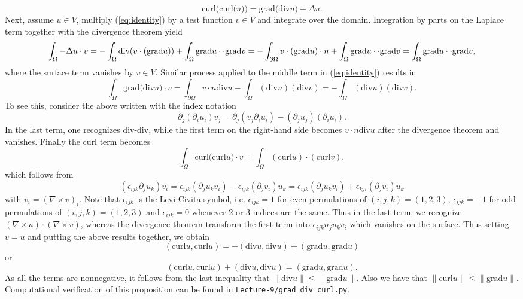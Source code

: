 \documentclass[a4paper,11pt]{article}
\newcommand{\norm}[1]{\ensuremath{\|#1\|}}
\newcommand{\Div}[1] {\ensuremath{\text{div}#1}}
\newcommand{\Grad}[1]{\ensuremath{\text{grad}#1}}
\newcommand{\Curl}[1]{\ensuremath{\text{curl}#1}}
\begin{document}
\begin{equation}
\label{eq:identity}
\Curl(\Curl(u)) = \Grad(\Div{u}) - \Delta u.
\end{equation}
Next, assume $u\in V$, multiply (\ref{eq:identity}) by a 
test function $v\in V$ and integrate over the domain. Integration by parts on the Laplace term together with
the divergence theorem yield
\[
\int_{\Omega}-\Delta u\cdot v = -\int_{\Omega}\Div(v\cdot(\Grad{u})) + \int_{\Omega} \Grad{u} \cdot\cdot \Grad{v} = 
-\int_{\partial\Omega}v\cdot(\Grad{u})\cdot n +
\int_{\Omega} \Grad{u} \cdot\cdot \Grad{v}{\tiny} = 
\int_{\Omega} \Grad{u} \cdot\cdot \Grad{v}{\tiny},
\]
where the surface term vanishes by $v\in V$. Similar process
applied to the middle term in (\ref{eq:identity}) results in 
\[
\int_\Omega \Grad(\Div{u})\cdot v = 
\int_{\partial\Omega} v\cdot n \Div{u}
- \int_{\Omega}(\Div{u})(\Div{v})=
- \int_{\Omega}(\Div{u})(\Div{v})
.
\]
To see this, consider the above written with the index notation
\[
\partial_j(\partial_i u_i)v_j =
\partial_j(v_j \partial_i u_i) - 
(\partial_j u_j)(\partial_i u_i).
\]
In the last term, one recognizes div-div, while the first term on the right-hand side becomes 
$v\cdot n \Div{u}$ after the divergence theorem and vanishes. Finally the curl term becomes
\[
\int_{\Omega}\Curl(\Curl{u})\cdot v = 
\int_{\Omega} (\Curl{u})\cdot (\Curl{v}),
\]
which follows from
\[
(\epsilon_{ijk}\partial_j u_k) v_i = 
\epsilon_{ijk}(\partial_j u_k v_i) -
\epsilon_{ijk}(\partial_j v_i) u_k = 
\epsilon_{ijk}(\partial_j u_k v_i) +
\epsilon_{kji}(\partial_j v_i) u_k
\]
with $v_i = (\nabla\times v)_i$. Note that $\epsilon_{ijk}$ is the Levi-Civita
symbol, i.e. $\epsilon_{ijk}=1$ for even permulations of $(i,j,k)=(1,2,3)$,
$\epsilon_{ijk}=-1$ for odd permulations of $(i,j,k)=(1,2,3)$ and
$\epsilon_{ijk}=0$ whenever 2 or 3 indices are the same. Thus in the last term,
we recognize $(\nabla\times u)\cdot (\nabla\times v)$, whereas
the divergence theorem transform the first term into
$\epsilon_{ijk}n_j u_k v_i$ which vanishes on the surface.
Thus setting $v=u$ and putting the above results together,
we obtain
\[
(\Curl u, \Curl u) = -(\Div{u}, \Div{u})+(\Grad{u}, \Grad{u})
\]
or 
\[
(\Curl u, \Curl u) + (\Div{u}, \Div{u}) = (\Grad{u}, \Grad{u}).
\]
As all the terms are nonnegative, it follows from the last inequality that $\norm{\Div{u}} \leq \norm{\Grad{u}}$. Also we 
have that $\norm{\Curl u} \leq \norm{\Grad{u}}$. Computational verification of this proposition can be found in \texttt{Lecture-9/grad \textunderscore div \textunderscore curl.py}.
\end{document}
